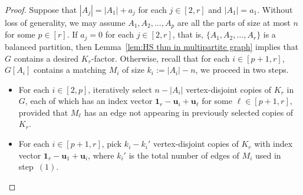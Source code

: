 \documentclass[11pt, a4paper]{article}
\theoremstyle{definition}
\newcommand{\<}{\subseteq}
\newcommand{\de}{\delta}
\begin{document}





\begin{proof}%
Suppose that $|A_j|=|A_1|+a_j$ for each $j \in [2, r]$ and $|A_1|=a_1$.
Without loss of generality, {we may assume $A_1,A_2,\ldots,A_p$ are all the parts of size at most $n$ for  some $p\in[r]$}.
If $a_j=0$ for each $j \in [2, r]$, that is, $\{A_1,A_2, \ldots, A_r\}$ is a balanced partition, then Lemma~\ref{lem:HS thm in multipartite graph} implies that $G$ contains a desired $K_r$-factor.
Otherwise, recall that for each $i \in [p+1,r]$, $G[A_i]$ contains a matching $M_i$ of size $k_i:=|A_i|-n$, we proceed in two steps. 
\begin{itemize}
    \item[$(1)$]  For each $i \in [2, p]$, iteratively select $n - |A_i|$ vertex-disjoint copies of $K_r$ in $G$, {each of which} has an index vector $\mathbf{1}_r - \mathbf{u}_i + \mathbf{u}_\ell$ for some $\ell\in[p+1, r]$,  
provided that $M_{\ell}$ has an edge not appearing in previously selected copies of $K_r$.

    \item[$(2)$]  For each $i \in [p+1, r]$, pick $k_i - k_i'$ vertex-disjoint copies of $K_r$ with index vector $\mathbf{1}_r - \mathbf{u}_1 + \mathbf{u}_i$, where $k_i'$ is the total number of edges of $M_i$ used in step~$(1)$.
\end{itemize}


\end{proof}
\end{document}
